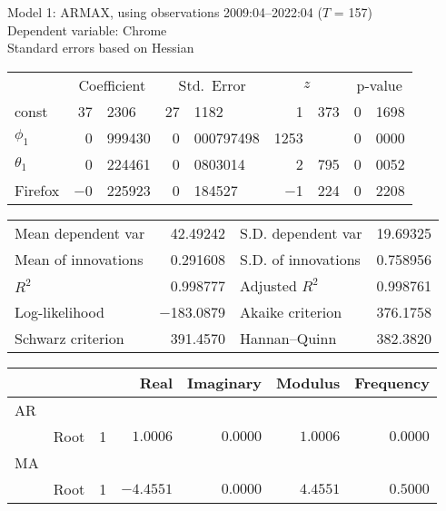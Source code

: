 \documentclass[11pt]{article}
\begin{document}
\thispagestyle{empty}

\begin{center}

Model 1: ARMAX, using observations 2009:04--2022:04 ($T$ = 157)\\
Dependent variable: Chrome\\
Standard errors based on Hessian

\vspace{1em}

\begin{tabular}{lr@{.}lr@{.}lr@{.}lr@{.}l}
  &
 \multicolumn{2}{c}{Coefficient} &
  \multicolumn{2}{c}{Std.\ Error} &
   \multicolumn{2}{c}{$z$} &
    \multicolumn{2}{c}{p-value} \\[1ex]
const &
  37&2306 &
    27&1182 &
      1&373 &
        0&1698 \\
$\phi_{1}$ &
  0&999430 &
    0&000797498 &
      1253& &
        0&0000 \\
$\theta_{1}$ &
  0&224461 &
    0&0803014 &
      2&795 &
        0&0052 \\
Firefox &
  $-$0&225923 &
    0&184527 &
      $-$1&224 &
        0&2208 \\
\end{tabular}

\vspace{1ex}
\begin{tabular}{lrlr}
Mean dependent var &  42.49242 & S.D. dependent var &  19.69325 \\
Mean of innovations &  0.291608 & S.D. of innovations &  0.758956 \\
$R^2$ &  0.998777 & Adjusted $R^2$ &  0.998761 \\
Log-likelihood & $-$183.0879 & Akaike criterion &  376.1758 \\
Schwarz criterion &  391.4570 & Hannan--Quinn &  382.3820 \\
\end{tabular}


\vspace{1em}

\begin{tabular}{llrrrrr}
& & & Real & Imaginary & Modulus & Frequency \\ \hline
AR \\ 
& Root & 1 & $1.0006$ & $0.0000$ & $1.0006$ & $0.0000$ \\ 
MA \\ 
& Root & 1 & $-4.4551$ & $0.0000$ & $4.4551$ & $0.5000$ \\ \hline
\end{tabular}

\end{center}
\end{document}
